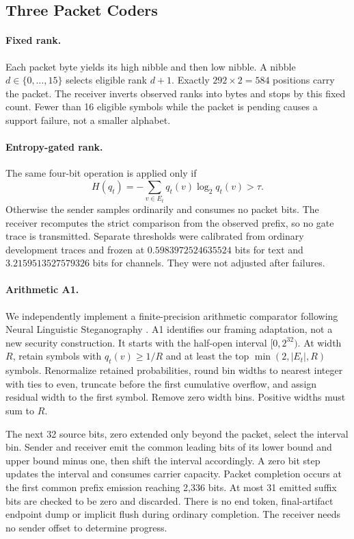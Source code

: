 \documentclass[a4paper,twoside]{article}
\begin{document}
\subsection{Three Packet Coders}
\label{sec:coders}
\paragraph{Fixed rank.}
Each packet byte yields its high nibble and then low nibble. A nibble $d\in\{0,\ldots,15\}$ selects eligible rank $d+1$. Exactly $292\times2=584$ positions carry the packet. The receiver inverts observed ranks into bytes and stops by this fixed count. Fewer than 16 eligible symbols while the packet is pending causes a support failure, not a smaller alphabet.

\paragraph{Entropy-gated rank.}
The same four-bit operation is applied only if
\begin{equation}
H(q_t)=-\sum_{v\in E_t}q_t(v)\log_2q_t(v)>\tau.
\end{equation}
Otherwise the sender samples ordinarily and consumes no packet bits. The receiver recomputes the strict comparison from the observed prefix, so no gate trace is transmitted. Separate thresholds were calibrated from ordinary development traces and frozen at $0.5983972524635524$ bits for text and $3.2159513527579326$ bits for channels. They were not adjusted after failures.

\paragraph{Arithmetic A1.}
We independently implement a finite-precision arithmetic comparator following Neural Linguistic Steganography \cite{ziegler}. A1 identifies our framing adaptation, not a new security construction. It starts with the half-open interval $[0,2^{32})$. At width $R$, retain symbols with $q_t(v)\geq1/R$ and at least the top $\min(2,|E_t|,R)$ symbols. Renormalize retained probabilities, round bin widths to nearest integer with ties to even, truncate before the first cumulative overflow, and assign residual width to the first symbol. Remove zero width bins. Positive widths must sum to $R$.

The next 32 source bits, zero extended only beyond the packet, select the interval bin. Sender and receiver emit the common leading bits of its lower bound and upper bound minus one, then shift the interval accordingly. A zero bit step updates the interval and consumes carrier capacity. Packet completion occurs at the first common prefix emission reaching 2,336 bits. At most 31 emitted suffix bits are checked to be zero and discarded. There is no end token, final-artifact endpoint dump or implicit flush during ordinary completion. The receiver needs no sender offset to determine progress.
\end{document}
